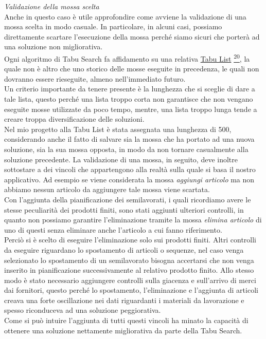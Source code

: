 \textit{Validazione della mossa scelta}\\
Anche in questo caso è utile approfondire come avviene la validazione di una mossa scelta in modo casuale. In particolare, in alcuni casi, possiamo direttamente scartare
l'esecuzione della mossa perché siamo sicuri che porterà ad una soluzione non migliorativa.\\ Ogni algoritmo di Tabu Search fa affidamento su una relativa 
\hyperref[Tabu List]{Tabu List\glo} \hyperref[list]{\textsuperscript{20}}, la quale
non è altro che uno storico delle mosse eseguite in precedenza, le quali non dovranno essere rieseguite, almeno nell'immediato futuro.\\ Un criterio importante da tenere presente
è la lunghezza che si sceglie di dare a tale lista, questo perché una lista troppo corta non garantisce che non vengano eseguite mosse utilizzate da poco tempo, mentre, una 
lista troppo lunga tende a creare troppa diversificazione delle soluzioni.\\ Nel mio progetto alla Tabu List è stata assegnata una lunghezza di 500, considerando anche il fatto
di salvare sia la mossa che ha portato ad una nuova soluzione, sia la sua mossa opposta, in modo da non tornare casualmente alla soluzione precedente. La validazione di una mossa,
in seguito, deve inoltre sottostare a dei vincoli che appartengono alla realtà sulla quale si basa il nostro applicativo. Ad esempio se viene considerata la mossa \textit{aggiungi articolo}
ma non abbiamo nessun articolo da aggiungere tale mossa viene scartata.\\ Con l'aggiunta della pianificazione dei semilavorati, i quali ricordiamo avere le stesse peculiarità
dei prodotti finiti, sono stati aggiunti ulteriori controlli, in quanto non possiamo garantire l'eliminazione tramite la mossa \textit{elimina articolo} di uno di questi senza
eliminare anche l'articolo a cui fanno riferimento.\\ Perciò si è scelto di eseguire l'eliminazione solo sui prodotti finiti. Altri controlli da eseguire riguardano lo spostamento
di articoli o sequenze, nel caso venga selezionato lo spostamento di un semilavorato bisogna accertarsi che non venga inserito in pianificazione successivamente al relativo
prodotto finito. Allo stesso modo è stato necessario aggiungere controlli sulla giacenza e sull'arrivo di merci dai fornitori, questo perché lo spostamento, l'eliminazione e l'aggiunta
di articoli creava una forte oscillazione nei dati riguardanti i materiali da lavorazione e spesso riconduceva ad una soluzione peggiorativa.\\ Come si può intuire l'aggiunta
di tutti questi vincoli ha minato la capacità di ottenere una soluzione nettamente migliorativa da parte della Tabu Search.\\

